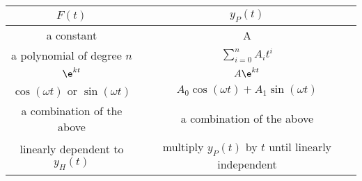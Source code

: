 \documentclass{article}
\begin{document}
\begin{table}[H]
    \centering
    \begin{tabular}{c | c}
        \toprule
        $F(t)$                                                             & $y_P(t)$                                                                \\
        \midrule
        a constant                                                         & A                                                                       \\
        a polynomial of degree $n$                                         & $\displaystyle \sum_{i = 0}^n A_i t^i$                                  \\
        $\e^{kt}$                                                          & $A \e^{kt}$                                                             \\
        $\cos{\left( \omega t \right)}$ or $\sin{\left( \omega t \right)}$ & $A_0 \cos{\left( \omega t \right)} + A_1 \sin{\left( \omega t \right)}$ \\
        a combination of the above                                         & a combination of the above                                              \\
        linearly dependent to $y_H(t)$                                     & multiply $y_P(t)$ by $t$ until linearly independent                     \\
        \bottomrule
    \end{tabular}
\end{table}
\end{document}

